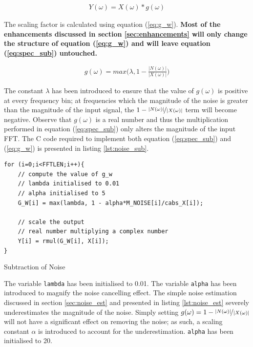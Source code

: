 \documentclass[a4paper,pra,twocolumn,10pt,aps,longbibliography,nobalancelastpage]{revtex4-1}
\begin{document}
\begin{align}
    Y(\omega) = X(\omega) * g(\omega)\label{eq:spec_sub}
\end{align}

The scaling factor is calculated using equation (\ref{eq:g_w}). \textbf{Most of the enhancements discussed in section \ref{sec:enhancements} will only change the structure of equation (\ref{eq:g_w}) and will leave equation (\ref{eq:spec_sub}) untouched.}

\begin{align}
    g(\omega) = max\Bigg(\lambda, 1 - \frac{|N(\omega)|}{|X(\omega)|}\Bigg)\label{eq:g_w}
\end{align}

The constant $\lambda$ has been introduced to ensure that the value of $g(\omega)$ is positive at every frequency bin; at frequencies which the magnitude of the noise is greater than the magnitude of the input signal, the $1-\nicefrac{|N(\omega)|}{|X(\omega)|}$ term will become negative. Observe that $g(\omega)$ is a real number and thus the multiplication performed in equation (\ref{eq:spec_sub}) only alters the magnitude of the input FFT. The C code required to implement both equation (\ref{eq:spec_sub}) and (\ref{eq:g_w}) is presented in listing \ref{lst:noise_sub}.

\begin{listing}
\begin{verbatim}
for (i=0;i<FFTLEN;i++){
    // compute the value of g_w
    // lambda initialised to 0.01
    // alpha initialised to 5
    G_W[i] = max(lambda, 1 - alpha*M_NOISE[i]/cabs_X[i]);
    
    // scale the output
    // real number multiplying a complex number
    Y[i] = rmul(G_W[i], X[i]);
}
\end{verbatim}
\caption{Subtraction of Noise} 
\label{lst:noise_sub}
\end{listing}

The variable {\tt lambda} has been initialised to 0.01. The variable {\tt alpha} has been introduced to magnify the noise cancelling effect. The simple noise estimation discussed in section \ref{sec:noise_est} and presented in listing \ref{lst:noise_est} severely underestimates the magnitude of the noise. Simply setting $g(\omega) = 1-\nicefrac{|N(\omega)|}{|X(\omega)|}$ will not have a significant effect on removing the noise; as such, a scaling constant $\alpha$ is introduced to account for the underestimation. {\tt alpha} has been initialised to 20.
\end{document}
